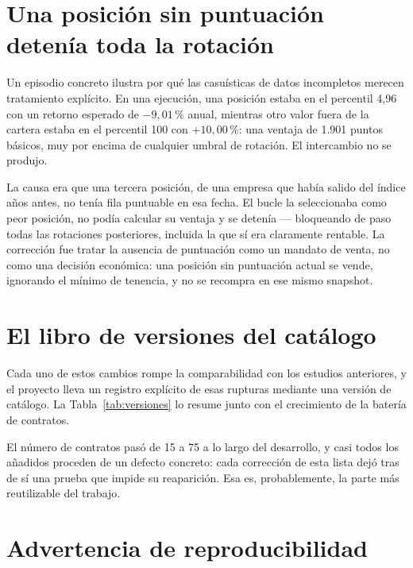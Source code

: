\section{Una posición sin puntuación detenía toda la rotación}

Un episodio concreto ilustra por qué las casuísticas de datos incompletos merecen tratamiento
explícito. En una ejecución, una posición estaba en el percentil 4,96 con un retorno esperado
de $-9{,}01\,\%$ anual, mientras otro valor fuera de la cartera estaba en el percentil 100 con
$+10{,}00\,\%$: una ventaja de 1.901 puntos básicos, muy por encima de cualquier umbral de rotación.
El intercambio no se produjo.

La causa era que una tercera posición, de una empresa que había salido del índice años antes, no
tenía fila puntuable en esa fecha. El bucle la seleccionaba como peor posición, no podía calcular su
ventaja y se detenía --- bloqueando de paso todas las rotaciones posteriores, incluida la que sí era
claramente rentable. La corrección fue tratar la ausencia de puntuación como un mandato de venta,
no como una decisión económica: una posición sin puntuación actual se vende, ignorando el mínimo de
tenencia, y no se recompra en ese mismo snapshot.

\section{El libro de versiones del catálogo}

Cada uno de estos cambios rompe la comparabilidad con los estudios anteriores, y el proyecto lleva
un registro explícito de esas rupturas mediante una versión de catálogo. La
Tabla~\ref{tab:versiones} lo resume junto con el crecimiento de la batería de contratos.

\begin{table}[H]
  \centering
  \footnotesize
  \caption{Versiones del catálogo cerrado y crecimiento de la batería de pruebas.}
  \label{tab:versiones}
  
  \caption*{Fuente:  y .}
\end{table}

El número de contratos pasó de 15 a 75 a lo largo del desarrollo, y casi todos los añadidos
proceden de un defecto concreto: cada corrección de esta lista dejó tras de sí una prueba que
impide su reaparición. Esa es, probablemente, la parte más reutilizable del trabajo.

\section{Advertencia de reproducibilidad}
\label{sec:reproducibilidad}

